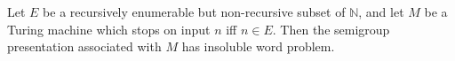 Let $E$ be a recursively enumerable but non-recursive subset of $\mathbb{N}$, and let $M$ be a Turing machine which stops on input $n$ iff $n \in E$. Then the semigroup presentation associated with $M$ has insoluble word problem.
